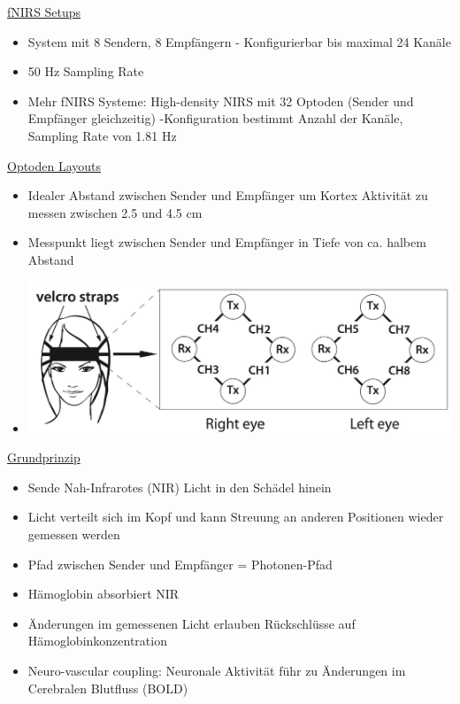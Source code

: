 \documentclass[a4paper,10pt,oneside]{article}
\begin{document}
\underline{fNIRS Setups} \\
	\begin{itemize}
		\item System mit 8 Sendern, 8 Empfängern - Konfigurierbar bis maximal 24 Kanäle 
		\item 50 Hz Sampling Rate
		\item Mehr fNIRS Systeme: High-density NIRS mit 32 Optoden (Sender und Empfänger gleichzeitig) -Konfiguration bestimmt Anzahl der Kanäle, Sampling Rate von 1.81 Hz
	\end{itemize}

\underline{Optoden Layouts} \\
	\begin{itemize}
		\item Idealer Abstand zwischen Sender und Empfänger um Kortex Aktivität zu messen zwischen 2.5 und 4.5 cm
		\item Messpunkt liegt zwischen Sender und Empfänger in Tiefe von ca. halbem Abstand
		\item[] \includegraphics[scale=0.2]{Grafiken/2107.png}
	\end{itemize}

\underline{Grundprinzip} \\
	\begin{itemize}
		\item Sende Nah-Infrarotes (NIR) Licht in den Schädel hinein
		\item Licht verteilt sich im Kopf und kann Streuung an anderen Positionen wieder gemessen werden
		\item Pfad zwischen Sender und Empfänger = Photonen-Pfad
		\item Hämoglobin absorbiert NIR
		\item Änderungen im gemessenen Licht erlauben Rückschlüsse auf Hämoglobinkonzentration
		\item Neuro-vascular coupling: Neuronale Aktivität führ zu Änderungen im Cerebralen Blutfluss (BOLD)
	\end{itemize}
 		
\end{document}
